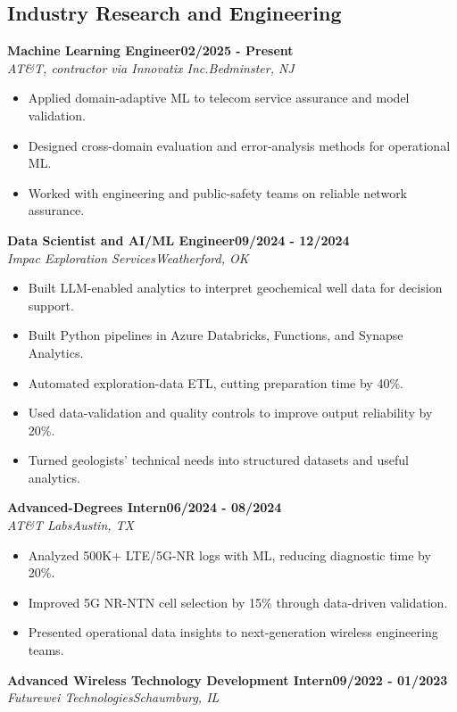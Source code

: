\documentclass[9pt,letterpaper]{extarticle}
\newcommand{\role}[4]{%
  \Needspace{4\baselineskip}\textbf{#1}\hfill\textbf{#2}\\[-1pt]
  \textit{#3}\hfill\textit{#4}\par}
\begin{document}
\subsection{Industry Research and Engineering}
\role{Machine Learning Engineer}{02/2025 - Present}{AT\&T, contractor via Innovatix Inc.}{Bedminster, NJ}
\begin{itemize}
\item Applied domain-adaptive ML to telecom service assurance and model validation.
\item Designed cross-domain evaluation and error-analysis methods for operational ML.
\item Worked with engineering and public-safety teams on reliable network assurance.
\end{itemize}
\vspace{1pt}
\role{Data Scientist and AI/ML Engineer}{09/2024 - 12/2024}{Impac Exploration Services}{Weatherford, OK}
\begin{itemize}
\item Built LLM-enabled analytics to interpret geochemical well data for decision support.
\item Built Python pipelines in Azure Databricks, Functions, and Synapse Analytics.
\item Automated exploration-data ETL, cutting preparation time by 40\%.
\item Used data-validation and quality controls to improve output reliability by 20\%.
\item Turned geologists' technical needs into structured datasets and useful analytics.
\end{itemize}
\vspace{1pt}
\role{Advanced-Degrees Intern}{06/2024 - 08/2024}{AT\&T Labs}{Austin, TX}
\begin{itemize}
\item Analyzed 500K+ LTE/5G-NR logs with ML, reducing diagnostic time by 20\%.
\item Improved 5G NR-NTN cell selection by 15\% through data-driven validation.
\item Presented operational data insights to next-generation wireless engineering teams.
\end{itemize}
\vspace{1pt}
\role{Advanced Wireless Technology Development Intern}{09/2022 - 01/2023}{Futurewei Technologies}{Schaumburg, IL}
\end{document}

